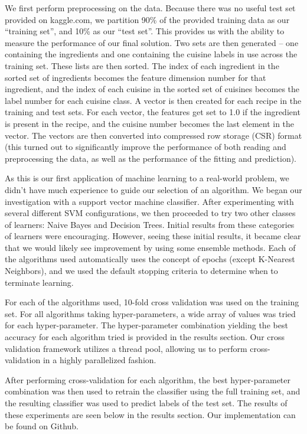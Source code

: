 \documentclass[11pt]{article}
\begin{document}
We first perform preprocessing on the data.  Because there was no
useful test set provided on kaggle.com, we partition 90\% of the
provided training data as our ``training set'', and 10\% as our ``test
set''. This provides us with the ability to measure the performance of
our final solution.  Two sets are then generated -- one containing the
ingredients and one containing the cuisine labels in use across the
training set.  These lists are then sorted.  The index of each
ingredient in the sorted set of ingredients becomes the feature 
dimension number for that ingredient, and the index of each cuisine in
the sorted set of cuisines becomes the label number for each cuisine
class.  A vector is then created for each recipe in the training and
test sets.  For each vector, the features get set to 1.0 if the
ingredient is present in the recipe, and the cuisine number becomes
the last element in the vector.  The vectors are then converted into
compressed row storage (CSR) format (this turned out to significantly
improve the performance of both reading and preprocessing the data, as 
well as the performance of the fitting and prediction).

As this is our first application of machine learning to a real-world
problem, we didn't have much experience to guide our selection of an
algorithm.  We began our investigation with a support vector machine
classifier.  After experimenting with several different SVM
configurations, we then proceeded to try two other classes of
learners: Naive Bayes and Decision Trees.  Initial results from these
categories of learners were encouraging.  However, seeing these
initial results, it became clear that we would likely see improvement
by using some ensemble methods.  Each of the algorithms used
automatically uses the concept of epochs (except K-Nearest Neighbors),
and we used the default stopping criteria to determine when to
terminate learning.  

For each of the algorithms used, 10-fold cross validation was used on
the training set.  For all algorithms taking hyper-parameters, a wide
array of values was tried for each hyper-parameter.  The
hyper-parameter combination yielding the best accuracy for each
algorithm tried is provided in the results section.  Our cross
validation framework utilizes a thread pool, allowing us to perform
cross-validation in a highly parallelized fashion.

After performing cross-validation for each algorithm, the best
hyper-parameter combination was then used to retrain the classifier
using the full training set, and the resulting classifier was used
to predict labels of the test set.  The results of these experiments
are seen below in the results section. Our implementation can be found
on Github\cite{repo}.
\end{document}
